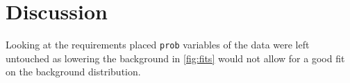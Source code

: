 %
%
%
%


\section{Discussion} %
\label{sec:Discussion}
Looking at the requirements placed \texttt{prob} variables of the data were 
left untouched as lowering the background in \autoref{fig:fits} would not 
allow for a good fit on the background distribution. \\

